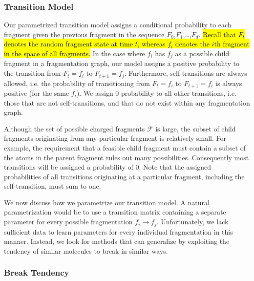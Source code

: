 \subsubsection{Transition Model}
\label{TransitionModel}

Our parametrized transition model assigns a conditional probability to each fragment given the previous fragment in the sequence $F_{0}$,$F_{1}$,\dots,$F_{d}$. 
\hl{Recall that $F_{t}$ denotes the random fragment state at time $t$, whereas $f_{i}$ denotes the $i$th fragment in the space of all fragments.} 
In the case where $f_{i}$ has $f_{j}$ as a possible child fragment in a fragmentation graph, our model assigns a positive probability to the transition from $F_{t} = f_{i}$ to $F_{t+1} = f_{j}$. 
Furthermore, self-transitions are always allowed, i.e. the probability of transitioning from $F_{t} = f_{i}$ to $F_{t+1} = f_{i}$ is always positive (for the same $f_{i}$). 
We assign 0 probability to all other transitions, i.e. those that are not self-transitions, and that do not exist within any fragmentation graph. 

Although the set of possible charged fragments $\mathcal{F}$ is large, the subset of child fragments originating from any particular fragment is relatively small. 
For example, the requirement that a feasible child fragment must contain a subset of the atoms in the parent fragment rules out many possibilities.  
Consequently most transitions will be assigned a probability of 0. 
Note that the assigned probabilities of all transitions originating at a particular fragment, including the self-transition, must sum to one.

We now discuss how we parametrize our transition model.
A natural parametrization would be to use a transition matrix containing a separate parameter for every possible fragmentation $f_{i}\rightarrow f_{j}$.
Unfortunately, we lack sufficient data to learn parameters for every individual fragmentation in this manner. 
Instead, we look for methods that can generalize by exploiting the tendency of similar molecules to break in similar ways.

\subsubsection{Break Tendency}
 
